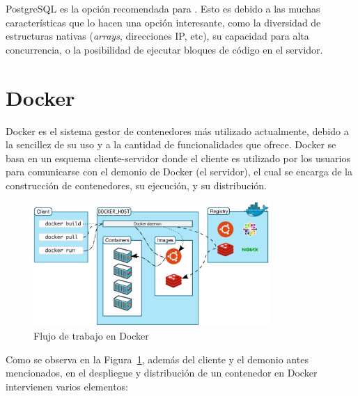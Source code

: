 PostgreSQL es la opción recomendada para . Esto es debido a las muchas características que lo hacen una opción interesante, como la diversidad de estructuras nativas (\emph{arrays}, direcciones IP, etc), su capacidad para alta concurrencia, o la posibilidad de ejecutar bloques de código en el servidor.


\section{Docker}

Docker es el sistema gestor de contenedores más utilizado actualmente, debido a la sencillez de su uso y a la cantidad de funcionalidades que ofrece. Docker se basa en un esquema cliente-servidor donde el cliente es utilizado por los usuarios para comunicarse con el demonio de Docker (el servidor), el cual se encarga de la construcción de contenedores, su ejecución, y su distribución. \emph{\parencite{Reference20}}

\begin{figure}[ht]
    \centering
    \includegraphics[width=0.8\textwidth]{Figures/docker-workflow}
    \decoRule
    \caption[Docker (Workflow)]{Flujo de trabajo en Docker \emph{\parencite{Reference20}}}
    \label{fig:docker-workflow}
\end{figure}

Como se observa en la Figura~\ref{fig:docker-workflow}, además del cliente y el demonio antes mencionados, en el despliegue y distribución de un contenedor en Docker intervienen varios elementos:

